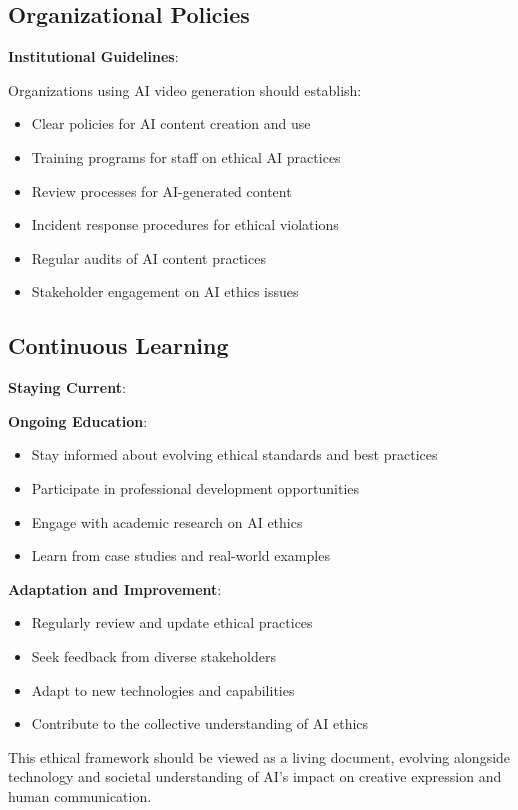 \subsection{Organizational Policies}
\textbf{Institutional Guidelines}:

Organizations using AI video generation should establish:
\begin{itemize}
\item Clear policies for AI content creation and use
\item Training programs for staff on ethical AI practices
\item Review processes for AI-generated content
\item Incident response procedures for ethical violations
\item Regular audits of AI content practices
\item Stakeholder engagement on AI ethics issues
\end{itemize}

\subsection{Continuous Learning}
\textbf{Staying Current}:

\textbf{Ongoing Education}:
\begin{itemize}
\item Stay informed about evolving ethical standards and best practices
\item Participate in professional development opportunities
\item Engage with academic research on AI ethics
\item Learn from case studies and real-world examples
\end{itemize}

\textbf{Adaptation and Improvement}:
\begin{itemize}
\item Regularly review and update ethical practices
\item Seek feedback from diverse stakeholders
\item Adapt to new technologies and capabilities
\item Contribute to the collective understanding of AI ethics
\end{itemize}

This ethical framework should be viewed as a living document, evolving alongside technology and societal understanding of AI's impact on creative expression and human communication.